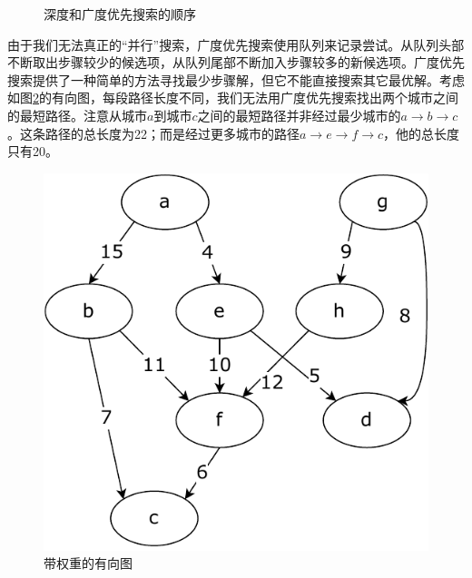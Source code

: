 \documentclass[b5paper]{ctexart}
\begin{document}
\begin{figure}[htbp]
 \centering
 \caption{深度和广度优先搜索的顺序}
 \label{fig:dfs-bfs-tree}
\end{figure}

由于我们无法真正的“并行”搜索，广度优先搜索使用队列来记录尝试。从队列头部不断取出步骤较少的候选项，从队列尾部不断加入步骤较多的新候选项。广度优先搜索提供了一种简单的方法寻找最少步骤解，但它不能直接搜索其它最优解。考虑如图\ref{fig:weighted-dag}的有向图，每段路径长度不同，我们无法用广度优先搜索找出两个城市之间的最短路径。注意从城市$a$到城市$c$之间的最短路径并非经过最少城市的$a \to b \to c$。这条路径的总长度为22；而是经过更多城市的路径$a \to e \to f \to c$，他的总长度只有20。

\begin{figure}[htbp]
 \centering
 \includegraphics[scale=0.5]{img/weighted-dag}
 \caption{带权重的有向图}
 \label{fig:weighted-dag}
\end{figure}

\begin{Exercise}
\end{Exercise}
\end{document}
